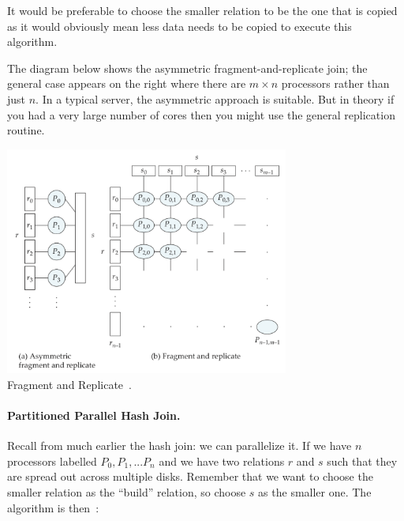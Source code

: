 It would be preferable to choose the smaller relation to be the one that is copied as it would obviously mean less data needs to be copied to execute this algorithm.

The diagram below shows the asymmetric fragment-and-replicate join; the general case appears on the right where there are $m \times n$ processors rather than just $n$. In a typical server, the asymmetric approach is suitable. But in theory if you had a very large number of cores then you might use the general replication routine. 

\begin{center}
\includegraphics[width=0.7\textwidth]{images/fragment-and-replicate}\\
Fragment and Replicate~\cite{dsc}.
\end{center}

\paragraph{Partitioned Parallel Hash Join.} 
Recall from much earlier the hash join: we can parallelize it. If we have $n$ processors labelled $P_{0}, P_{1}, ... P_{n}$ and we have two relations $r$ and $s$ such that they are spread out across multiple disks. Remember that we want to choose the smaller relation as the ``build'' relation, so choose $s$ as the smaller one. The algorithm is then~\cite{dsc}:

